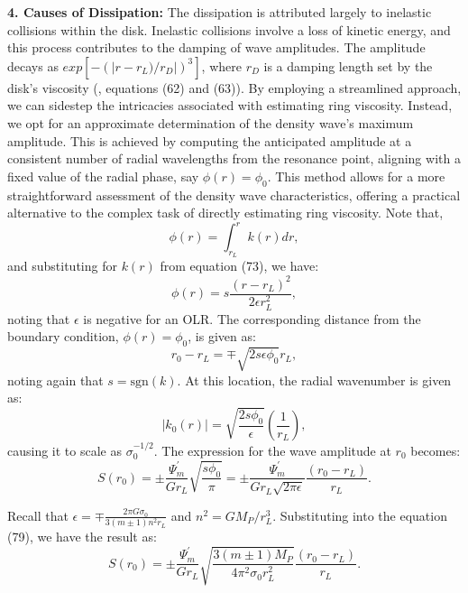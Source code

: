 \documentclass{article}
\begin{document}
\textbf{4. Causes of Dissipation:} The dissipation is attributed largely to inelastic collisions within the disk. Inelastic collisions involve a loss of kinetic energy, and this process contributes to the damping of wave amplitudes. The amplitude decays as $exp[-(|r - r_{L})/r_{D}|)^{3}]$, where $r_{D}$ is a damping length set by the disk's viscosity (\cite{1984prin.conf..513S}, equations (62) and (63)). By employing a streamlined approach, we can sidestep the intricacies associated with estimating ring viscosity. Instead, we opt for an approximate determination of the density wave's maximum amplitude. This is achieved by computing the anticipated amplitude at a consistent number of radial wavelengths from the resonance point, aligning with a fixed value of the radial phase, say $\phi(r) = \phi_{0}$. This method allows for a more straightforward assessment of the density wave characteristics, offering a practical alternative to the complex task of directly estimating ring viscosity. Note that, 
\begin{equation}
    \phi(r) = \int_{r_{L}}^{r} k(r) dr,
\end{equation}
and substituting for $k(r)$ from equation (73), we have:
\begin{equation}
    \phi(r) = s \frac{(r - r_{L})^2}{2 \epsilon r_{L}^{2}},
\end{equation}
noting that $\epsilon$ is negative for an OLR. The corresponding distance from the boundary condition, $\phi(r) = \phi_{0}$, is given as:
\begin{equation}
    r_{0} - r_{L} = \mp \sqrt{2 s \epsilon \phi_{0}} r_{L},
\end{equation}
noting again that $s = \mathrm{sgn}(k)$. At this location, the radial wavenumber is given as: 
\begin{equation}
    |k_{0}(r)| = \sqrt{\frac{2s\phi_{0}}{\epsilon}}\left(\frac{1}{r_{L}}\right),
\end{equation}
causing it to scale as $\sigma_{0}^{-1/2}$. The expression for the wave amplitude at $r_{0}$ becomes:
\begin{equation}
    S(r_{0}) = \pm \frac{\Psi_{m}^{'}}{G r_{L}} \sqrt{\frac{s \phi_{0}}{\pi}} = \pm \frac{\Psi_{m}^{'}}{G r_{L} \sqrt{2\pi\epsilon}}\frac{(r_{0} - r_{L})}{r_{L}}.
\end{equation}

Recall that $\epsilon = \mp \frac{2\pi G \sigma_{0}}{3(m\pm1)n^{2}r_{L}}$ and $n^{2} = G M_{P}/r_{L}^{3}$. Substituting into the equation (79), we have the result as:
\begin{equation}
    S(r_{0}) = \pm \frac{\Psi_{m}^{'}}{G r_{L}} \sqrt{\frac{3(m\pm1)M_{P}}{4\pi^{2} \sigma_{0}r_{L}^{2}}}   \frac{(r_{0} - r_{L})}{r_{L}}.
\end{equation}
\end{document}
